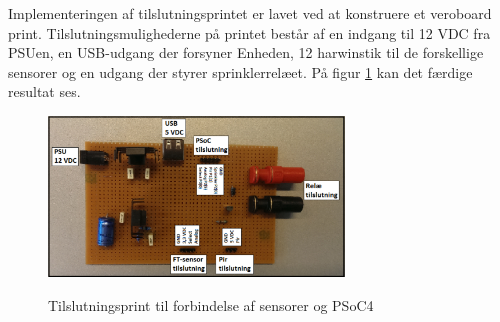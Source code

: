 Implementeringen af tilslutningsprintet er lavet ved at konstruere et veroboard print. Tilslutningsmulighederne på printet består af en indgang til 12 VDC fra PSUen, en USB-udgang der forsyner Enheden, 12 harwinstik til de forskellige sensorer og en udgang der styrer sprinklerrelæet. På figur \ref{lab:Tilslutningsprint} kan det færdige resultat ses. 

\begin{figure}[htb]
\centering
{\includegraphics[width=0.70\textwidth]{filer/pics/Tilslutningsprint}}
\caption{Tilslutningsprint til forbindelse af sensorer og PSoC4}
\label{lab:Tilslutningsprint}
\end{figure}



